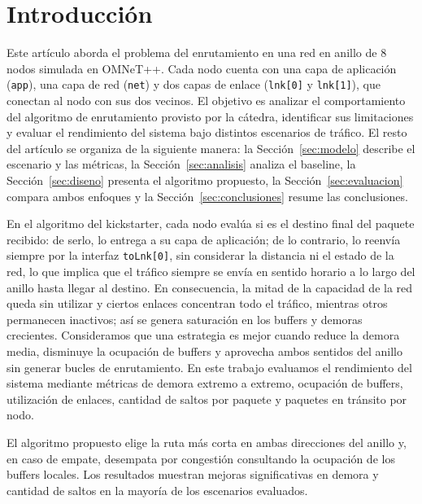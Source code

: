 \documentclass[10pt,letterpaper,twocolumn]{article}
\begin{document}

\section{Introducción}
\label{sec:intro}

Este artículo aborda el problema del enrutamiento en una red en anillo de 8 nodos simulada en OMNeT++. Cada nodo cuenta con una capa de aplicación (\texttt{app}), una capa de red (\texttt{net}) y dos capas de enlace (\texttt{lnk[0]} y \texttt{lnk[1]}), que conectan al nodo con sus dos vecinos. El objetivo es analizar el comportamiento del algoritmo de enrutamiento provisto por la cátedra, identificar sus limitaciones y evaluar el rendimiento del sistema bajo distintos escenarios de tráfico. El resto del artículo se organiza de la siguiente manera: la Sección~\ref{sec:modelo} describe el escenario y las métricas, la Sección~\ref{sec:analisis} analiza el baseline, la Sección~\ref{sec:diseno} presenta el algoritmo propuesto, la Sección~\ref{sec:evaluacion} compara ambos enfoques y la Sección~\ref{sec:conclusiones} resume las conclusiones.

En el algoritmo del kickstarter, cada nodo evalúa si es el destino final del paquete recibido: de serlo, lo entrega a su capa de aplicación; de lo contrario, lo reenvía siempre por la interfaz \texttt{toLnk[0]}, sin considerar la distancia ni el estado de la red, lo que implica que el tráfico siempre se envía en sentido horario a lo largo del anillo hasta llegar al destino. En consecuencia, la mitad de la capacidad de la red queda sin utilizar y ciertos enlaces concentran todo el tráfico, mientras otros permanecen inactivos; así se genera saturación en los buffers y demoras crecientes. Consideramos que una estrategia es mejor cuando reduce la demora media, disminuye la ocupación de buffers y aprovecha ambos sentidos del anillo sin generar bucles de enrutamiento. En este trabajo evaluamos el rendimiento del sistema mediante métricas de demora extremo a extremo, ocupación de buffers, utilización de enlaces, cantidad de saltos por paquete y paquetes en tránsito por nodo.

El algoritmo propuesto elige la ruta más corta en ambas direcciones del anillo y, en caso de empate, desempata por congestión consultando la ocupación de los buffers locales. Los resultados muestran mejoras significativas en demora y cantidad de saltos en la mayoría de los escenarios evaluados.
\end{document}
